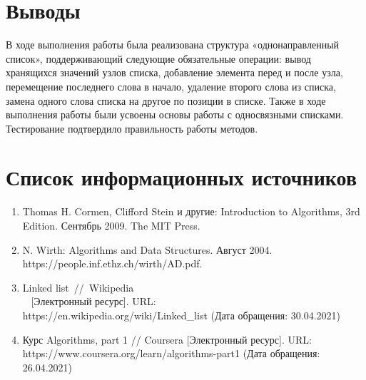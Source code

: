 \documentclass[a4paper, 14pt]{extarticle}
\begin{document}
\section*{Выводы}
В ходе выполнения работы была реализована структура
«однонаправленный список», поддерживающий следующие обязательные операции: вывод
хранящихся значений узлов списка, добавление элемента перед и после узла, перемещение
последнего слова в начало, удаление второго слова из списка,
замена одного слова списка на другое по позиции в списке. Также в ходе
выполнения работы были усвоены основы работы с односвязными списками.
Тестирование подтвердило правильность работы методов.
\section*{Список информационных источников}
\begin{enumerate}[leftmargin=*] %
  \item Thomas H. Cormen, Clifford Stein и другие: Introduction to Algorithms, 3rd Edition.
    Сентябрь 2009. The MIT Press.
  \item N. Wirth: Algorithms and Data Structures. Август 2004.
    \\ https://people.inf.ethz.ch/wirth/AD.pdf.
  \item Linked list~//~Wikipedia \\~
    [Электронный ресурс]. URL:
    \\ https://en.wikipedia.org/wiki/Linked\_list
    (Дата обращения: 30.04.2021)
   \item Курс Algorithms, part 1 // Coursera [Электронный ресурс]. URL:
     \\ https://www.coursera.org/learn/algorithms-part1
     (Дата обращения: 26.04.2021)
\end{enumerate}
\end{document}
